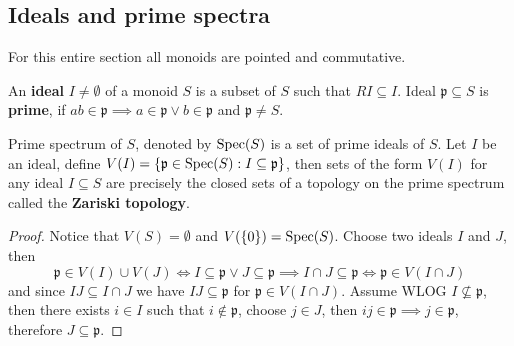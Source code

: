 \subsection{Ideals and prime spectra}
    For this entire section all monoids are pointed and commutative.
    \begin{definition}
        An \textbf{ideal} $I\neq\emptyset$ of a monoid $S$ is a subset of $S$ such that 
        $RI \subseteq I$. Ideal $\mathfrak{p}\subseteq S$ is \textbf{prime}, if $ab\in\mathfrak{p}\implies a\in\mathfrak{p}\lor b\in\mathfrak{p}$ and $\mathfrak{p}\neq S$. 
    \end{definition}
    \begin{definition}
        Prime spectrum of $S$, denoted by $\mathrm{Spec}(S)$ is a set of prime ideals of $S$. Let $I$ be an ideal, 
        define $V(I) = \{\mathfrak{p}\in\mathrm{Spec}(S) : I \subseteq\mathfrak{p}\}$, then sets of the form $V(I)$ for any
        ideal $I\subseteq S$ are
        precisely the closed sets of a topology on the prime spectrum called the \textbf{Zariski topology}.
    \end{definition}
    \begin{proof}[Proof]
        Notice that $V(S)=\emptyset$ and $V(\{0\}) = \mathrm{Spec}(S)$. Choose two ideals $I$ and $J$, then 
        \[
        \mathfrak{p}\in V(I)\cup V(J) \iff I\subseteq\mathfrak{p}\lor J\subseteq\mathfrak{p} \implies I\cap J\subseteq\mathfrak{p}\iff\mathfrak{p}\in V(I\cap J) 
        \]
        and since $IJ\subseteq I\cap J$ we have $IJ\subseteq\mathfrak{p}$ for $\mathfrak{p}\in V(I\cap J)$.
        Assume WLOG $I\not\subseteq\mathfrak{p}$, then there exists $i\in I$ such that $i\not\in\mathfrak{p}$,
        choose $j\in J$, then $ij\in\mathfrak{p} \implies j\in\mathfrak{p}$, therefore $J\subseteq\mathfrak{p}$.
    \end{proof}
    
